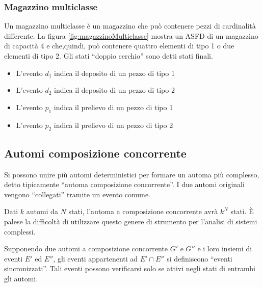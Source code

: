 \documentclass[a4paper]{report}
\begin{document}
\subsubsection{Magazzino multiclasse}
Un magazzino multiclasse \`e un magazzino che pu\`o contenere pezzi di
cardinalit\`a differente. La figura \ref{fig:magazzinoMulticlasse} mostra
un ASFD di un magazzino di capacit\`a 4 e che,quindi, pu\`o contenere
quattro elementi di tipo 1 o due elementi di tipo 2. Gli stati
``doppio cerchio'' sono detti stati finali.

\begin{itemize}
\item L'evento $d_1$ indica il deposito di un pezzo di tipo 1
\item L'evento $d_2$ indica il deposito di un pezzo di tipo 2
\item L'evento $p_1$ indica il prelievo di un pezzo di tipo 1
\item L'evento $p_2$ indica il prelievo di un pezzo di tipo 2
\end{itemize}


\subsection{Automi composizione concorrente}
Si possono unire pi\`u automi deterministici per formare un automa
pi\`u complesso, detto tipicamente ``automa composizione
concorrente''. I due automi originali vengono ``collegati'' tramite un
evento comune. 

Dati $k$ automi da $N$ stati, l'automa a composizione concorrente avr\`a
$k^N$ stati. \`E palese la difficolt\`a di utilizzare questo genere di
strumento per l'analisi di sistemi complessi.

Supponendo due automi a composizione concorrente $G'$ e $G''$ e i loro
insiemi di eventi $E'$ ed $E''$, gli eventi appartenenti ad $E' \cap
E''$ si definiscono ``eventi sincronizzati''. Tali eventi possono verificarsi solo se attivi negli
stati di entrambi gli automi.
\end{document}
